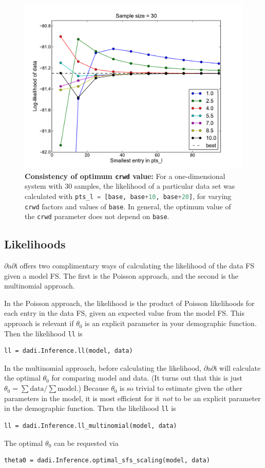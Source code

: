 \documentclass[12pt]{article}
\makeatletter
\newcommand{\dadi}{$\partial$a$\partial$i\xspace}
\newcommand{\py}[1]{\lstinline[language=Python, showstringspaces=False]@#1@}
\makeatother
\begin{document}
\begin{figure}
\centering
\includegraphics[scale=0.37]{consistent_crwd}
\caption{\textbf{Consistency of optimum \py{crwd} value:} For a one-dimensional system with 30 samples, the likelihood of a particular data set was calculated with \py{pts_l = [base, base+10, base+20]}, for varying \py{crwd} factors and values of \py{base}. In general, the optimum value of the \py{crwd} parameter does not depend on \py{base}.\label{fig:consistent_crwd}}
\end{figure}

\subsection{Likelihoods}

\dadi offers two complimentary ways of calculating the likelihood of the data FS given a model FS.
The first is the Poisson approach, and the second is the multinomial approach.

In the Poisson approach, the likelihood is the product of Poisson likelihoods for each entry in the data FS, given an expected value from the model FS.
This approach is relevant if $\theta_0$ is an explicit parameter in your demographic function.
Then the likelihood \py{ll} is
\begin{lstlisting}
ll = dadi.Inference.ll(model, data)
\end{lstlisting}

In the multinomial approach, before calculating the likelihood, \dadi will calculate the optimal $\theta_0$ for comparing model and data.
(It turns out that this is just $\theta_0 = \sum \text{data} / \sum \text{model}$.)
Because $\theta_0$ is so trivial to estimate given the other parameters in the model, it is most efficient for it \emph{not} to be an explicit parameter in the demographic function.
Then the likelihood \py{ll} is
\begin{lstlisting}
ll = dadi.Inference.ll_multinomial(model, data)
\end{lstlisting}
The optimal $\theta_0$ can be requested via
\begin{lstlisting}
theta0 = dadi.Inference.optimal_sfs_scaling(model, data)
\end{lstlisting}
\end{document}
